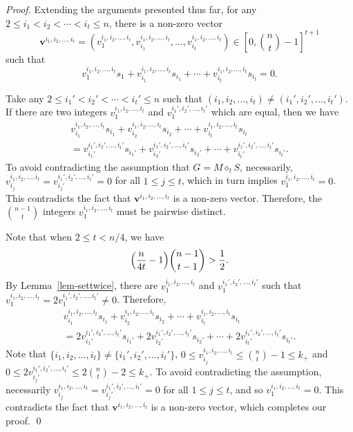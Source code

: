 \documentclass[sort&compress]{elsarticle}
\DeclarePairedDelimiter\parenv{\lparen}{\rparen}
\renewcommand{\leq}{\leqslant}
\newcommand{\vv}{\mathbf{v}}
\newcommand{\kp}{k_+}
\newcommand{\splt}{\diamond}
\begin{document}
\begin{proof}
  Extending the arguments presented thus far, for any $2\leq
  i_1<i_2<\cdots <i_t \leq n$, there is a non-zero vector
  \[\vv^{i_1,i_2,\ldots, i_t} =(v_1^{i_1,i_2,\ldots, i_t}, v_{i_1}^{i_1,i_2,\ldots,i_t}, \ldots, v_{i_t}^{i_1,i_2,\ldots, i_t}) \in \left[0, \binom{n}{t}-1\right]^{t+1}\] such that  
   \begin{equation*}\label{eq-ls}
   v_1^{i_1,i_2,\ldots, i_t}s_1+ v_{i_1}^{i_1,i_2,\ldots, i_t} s_{i_1}+\cdots +  v_{i_t}^{i_1,i_2,\ldots, i_t}s_{i_t} =0.
   \end{equation*}

   Take any $2\leq i_1'<i_2'<\cdots <i_t' \leq n$ such that
   $(i_1,i_2,\dots,i_t)\neq(i_1',i_2',\dots,i_t')$.  If there are two
   integers $v_1^{i_1,i_2,\ldots, i_t}$ and $v_1^{i_1',i_2',\ldots,
     i_t'}$ which are equal, then we have
   \begin{multline*}
     v_{i_1}^{i_1,i_2,\ldots, i_t} s_{i_1}+v_{i_2}^{i_1,i_2,\ldots, i_t} s_{i_2}+\cdots +  v_{i_t}^{i_1,i_2,\ldots, i_t}s_{i_t}\\
     =v_{i_1'}^{i_1',i_2',\ldots, i_t'} s_{i_1'}+v_{i_2'}^{i_1',i_2',\ldots, i_t'} s_{i_2'}+\cdots +  v_{i_t'}^{i_1',i_2',\ldots, i_t'}s_{i_t'}.
   \end{multline*}
   To avoid contradicting the assumption that $G=M\splt_t S$,
   necessarily, $v_{i_j}^{i_1,i_2,\ldots,
     i_t}=v_{i_j'}^{i_1',i_2',\ldots, i_t'}=0$ for all $1\leq j \leq
   t$, which in turn implies $v_{1}^{i_1,i_2,\ldots, i_t}=0$. This
   contradicts the fact that $\vv^{i_1,i_2,\ldots, i_t}$ is a non-zero
   vector.  Therefore, the $\binom{n-1}{t}$ integers
   $v_1^{i_1,i_2,\ldots, i_t}$ must be pairwise distinct.
    
   Note that when $2\leq t < n/4$, we have  
   \[\parenv*{\frac{n}{4t}-1}\binom{n-1}{t-1}> \frac{1}{2}.\] 
   By Lemma~\ref{lem-settwice}, there are
   $v_1^{i_1,i_2,\ldots, i_t}$ and $v_1^{i_1',i_2',\ldots, i_t'}$ such
   that $v_1^{i_1,i_2,\ldots, i_t} =2 v_1^{i_1',i_2',\ldots,
     i_t'}\neq 0$. Therefore,
   \begin{multline*}
     v_{i_1}^{i_1,i_2,\ldots, i_t}
   s_{i_1}+v_{i_2}^{i_1,i_2,\ldots, i_t} s_{i_2}+\cdots +
   v_{i_t}^{i_1,i_2,\ldots, i_t}s_{i_t}\\
   =2v_{i_1'}^{i_1',i_2',\ldots,
     i_t'} s_{i_1'}+2v_{i_2'}^{i_1',i_2',\ldots, i_t'} s_{i_2'}+\cdots
   + 2 v_{i_t'}^{i_1',i_2',\ldots, i_t'}s_{i_t'}.
   \end{multline*}
   Note that $\{i_1,i_2,\ldots, i_t\}\neq \{i_1',i_2',\ldots, i_t'\}$,
   $0\leq v_{i_j}^{i_1,i_2,\ldots, i_t} \leq \binom{n}{t}-1 \leq \kp$
   and $0\leq 2v_{i_j'}^{i_1',i_2',\ldots, i_t'} \leq 2\binom{n}{t}-2
   \leq \kp$. To avoid contradicting the assumption, necessarily
   $v_{i_j}^{i_1,i_2,\ldots, i_t}=v_{i_j'}^{i_1',i_2',\ldots, i_t'}=0$
   for all $1\leq j\leq t$, and so $v_{1}^{i_1,i_2,\ldots,
     i_t}=0$. This contradicts the fact that $\vv^{i_1,i_2,\ldots,
     i_t}$ is a non-zero vector, which completes our proof.
   \qed\end{proof}
\end{document}
